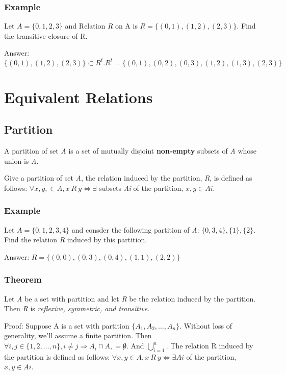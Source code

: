 \documentclass[12pt]{article}
\begin{document}
\subsubsection*{Example}
Let $A = \{0,1,2,3\}$ and Relation \textit{R} on A is $R = \{(0,1),(1,2),(2,3)\}$. Find the transitive closure of R.

\noindent
Answer: $\{(0,1),(1,2),(2,3)\} \subset R^{t}. R^{t} = \{(0,1),(0,2),(0,3),(1,2),(1,3),(2,3)\}$

\section*{Equivalent Relations}
\subsection*{Partition}
A partition of set \textit{A} is a set of mutually disjoint \textbf{non-empty} subsets of \textit{A} whose union is \textit{A}. 

Give a partition of set \textit{A}, the relation induced by the partition, \textit{R}, is defined as follows: $\forall x,y, \in A, x \ R \ y \Leftrightarrow \exists$ subsets \textit{Ai} of the partition, $x, y \in Ai$.

\subsubsection*{Example}
Let $A = \{ 0, 1, 2, 3, 4 \}$ and consder the following partition of \textit{A}: $ \{0, 3, 4 \}, \{1\}, \{2\}$. Find the relation \textit{R} induced by this partition.

\noindent
Answer: $R = \{ (0,0), (0,3), (0,4), (1,1), (2,2) \}$

\subsubsection*{Theorem}
Let \textit{A} be a set with partition and let \textit{R} be the relation induced by the partition. Then \textit{R} is \emph{reflexive, symmetric, and transitive}.

Proof: Suppose A is a set with partition $\{ A_1, A_2, \ldots , A_n \}$. Without loss of generality, we'll assume a finite partition. Then $\forall i, j \in \{ 1, 2, \ldots , n \}, i \not = j \Rightarrow A_i \cap A, = \not 0.$ And $\bigcup\limits_{i=1}^{n}$. The relation R induced by the partition is defined as follows: $\forall x,y \in A, x \ R \ y \Leftrightarrow \exists Ai$ of the partition, $x, y \in Ai$.
\end{document}
